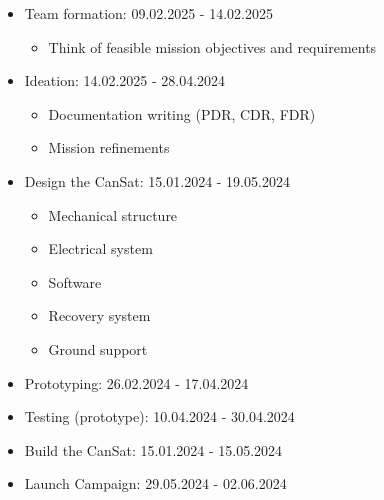 \begin{itemize}[leftmargin=1cm, itemindent=0.25cm, noitemsep, topsep=0pt, label=$\bullet$]
\item Team formation: 09.02.2025 - 14.02.2025
\begin{multicols}{2}[\vspace{-0.75\baselineskip}]
\begin{itemize}[label=, noitemsep, topsep=2pt]
\item Think of feasible mission objectives and requirements
\end{itemize}
\end{multicols}
\vspace*{-0.75\baselineskip}
\item Ideation: 14.02.2025 - 28.04.2024
\begin{multicols}{2}[\vspace{-0.75\baselineskip}]
\begin{itemize}[label=, noitemsep, topsep=2pt]
\item Documentation writing (PDR, CDR, FDR)
\item Mission refinements
\end{itemize}
\end{multicols}
\vspace*{-0.75\baselineskip}
\item Design the CanSat: 15.01.2024 - 19.05.2024
\begin{multicols}{2}[\vspace{-0.75\baselineskip}]
\begin{itemize}[label=, noitemsep, topsep=2pt]
\item Mechanical structure 
\item Electrical system
\item Software
\item Recovery system
\item Ground support
\end{itemize}
\end{multicols}
\vspace*{-0.75\baselineskip}
\item Prototyping: 26.02.2024 - 17.04.2024
\item Testing (prototype): 10.04.2024 - 30.04.2024
\item Build the CanSat: 15.01.2024 - 15.05.2024
\item Launch Campaign: 29.05.2024 - 02.06.2024
\end{itemize}

